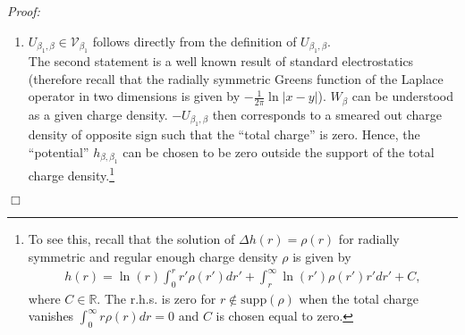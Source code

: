 \documentclass[11pt, english, american]{article}
\newenvironment{proof}{\emph{Proof:}}{\begin{flushright} $ \Box $ \end{flushright}}
\begin{document}
\begin{proof} 
\begin{enumerate}
\item
$U_{\beta_1,\beta} \in \mathcal{V}_{\beta_1} $ follows directly from the definition of $U_{\beta_1,\beta}$.
\\
The second statement is a well known result of standard electrostatics (therefore recall that the radially symmetric Greens function of the Laplace operator in two dimensions is given by $-\frac{1}{2\pi} \ln \vert x-y \vert$). $W_\beta$ can be understood as a
given charge density. $-U_{\beta_1,\beta}$ then corresponds to a smeared out charge density of opposite sign such that the ``total charge'' is zero. Hence, the
``potential'' $h_{\beta,\beta_1}$ can be chosen to be zero outside the support of the total charge density.\footnote{To see this, recall that the solution of $\Delta h(r) = \rho(r)$ for radially symmetric and regular enough charge density $\rho$ is given by
\begin{align*}
h(r) = \ln (r) \int_0^r r'\rho(r') dr' + \int_r^{\infty} \ln (r') \rho(r') r' dr' + C,
\end{align*}
where $C\in \mathbb R$. The r.h.s. is zero for $r \not\in \text{supp}(\rho)$ when the total charge vanishes $\int_0^{\infty} r \rho(r) dr=0$ and $C$ is chosen equal to zero.}



\end{enumerate}
\end{proof}
\end{document}
